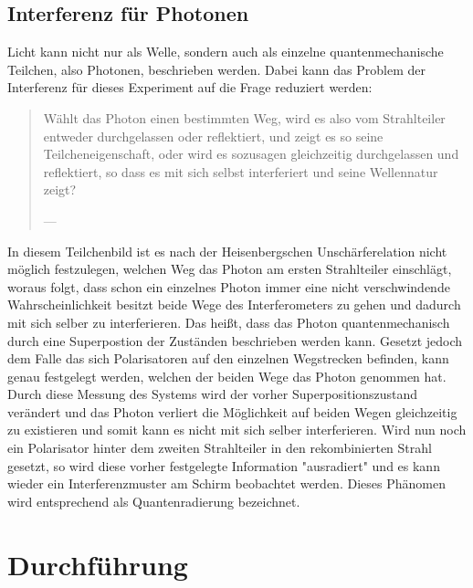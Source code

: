 \documentclass[numbers=noenddot,a4paper,notitlepage,twoside,BCOR15mm]{scrartcl}
\begin{document}
	\subsection{Interferenz für Photonen}
	
	Licht kann nicht nur als Welle, sondern auch als einzelne quantenmechanische Teilchen, also Photonen, beschrieben werden. Dabei kann das Problem der Interferenz für dieses Experiment auf die Frage reduziert werden: 
	\begin{quote}
		Wählt das Photon einen bestimmten Weg, wird es also vom Strahlteiler entweder durchgelassen oder reflektiert, und zeigt es so seine Teilcheneigenschaft, oder wird es sozusagen gleichzeitig durchgelassen und reflektiert, so dass es mit sich selbst interferiert und seine Wellennatur zeigt? \par\raggedleft ---
	\end{quote}
	In diesem Teilchenbild ist es nach der Heisenbergschen Unschärferelation nicht möglich festzulegen, welchen Weg das Photon am ersten Strahlteiler einschlägt, woraus folgt, dass schon ein einzelnes Photon immer eine nicht verschwindende Wahrscheinlichkeit besitzt beide Wege des Interferometers zu gehen und dadurch mit sich selber zu interferieren. Das heißt, dass das Photon quantenmechanisch durch eine Superpostion der Zuständen beschrieben werden kann. Gesetzt jedoch dem Falle das sich Polarisatoren auf den einzelnen Wegstrecken befinden, kann genau festgelegt werden, welchen der beiden Wege das Photon genommen hat. Durch diese Messung des Systems wird der vorher Superpositionszustand verändert und das Photon verliert die Möglichkeit auf beiden Wegen gleichzeitig zu existieren und somit kann es nicht mit sich selber interferieren. Wird nun noch ein Polarisator hinter dem zweiten Strahlteiler in den rekombinierten Strahl gesetzt, so wird diese vorher festgelegte Information {}"ausradiert{}" und es kann wieder ein Interferenzmuster am Schirm beobachtet werden. Dieses Phänomen wird entsprechend als Quantenradierung bezeichnet.
	
	
	\newpage
	\section{Durchführung}
	
\end{document}
